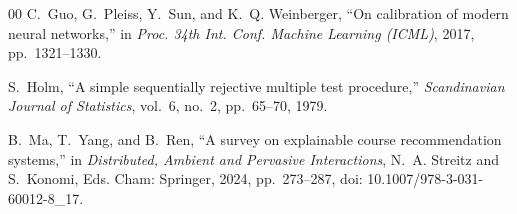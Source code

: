 \documentclass[conference]{IEEEtran}
\begin{document}
\begin{thebibliography}{00}
C.~Guo, G.~Pleiss, Y.~Sun, and K.~Q. Weinberger, ``On calibration of modern neural
networks,'' in \emph{Proc. 34th Int. Conf. Machine Learning (ICML)}, 2017,
pp.~1321--1330.

S.~Holm, ``A simple sequentially rejective multiple test procedure,''
\emph{Scandinavian Journal of Statistics}, vol.~6, no.~2, pp.~65--70, 1979.

B.~Ma, T.~Yang, and B.~Ren, ``A survey on explainable course recommendation systems,''
in \emph{Distributed, Ambient and Pervasive Interactions}, N.~A. Streitz and S.~Konomi,
Eds. Cham: Springer, 2024, pp.~273--287, doi: 10.1007/978-3-031-60012-8\_17.

\end{thebibliography}
\end{document}
